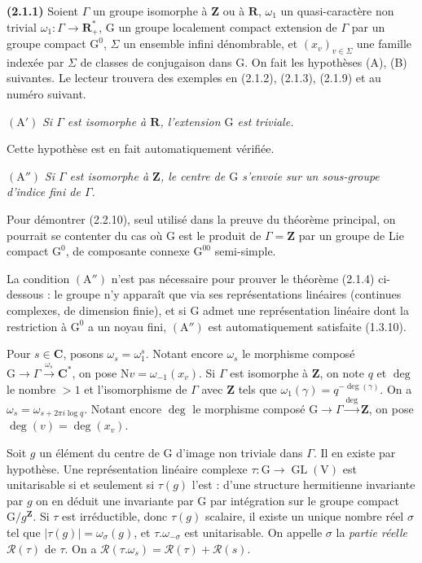 \documentclass[11pt,leqno]{article}
\begin{document}
\textbf{(2.1.1)} Soient \(\Gamma\) un groupe isomorphe à \(\mathbf{Z}\) ou à \(\mathbf{R}\), \(\omega_1\) un quasi-caractère non trivial \(\omega_1:\Gamma\to\mathbf{R}_+^*\), \(\mathrm{G}\) un groupe localement compact extension de \(\Gamma\) par un groupe compact \(\mathrm{G}^0\), \(\Sigma\) un ensemble infini dénombrable, et \((x_v)_{v\in\Sigma}\) une famille indexée par \(\Sigma\) de classes de conjugaison dans \(\mathrm{G}\). On fait les hypothèses (A), (B) suivantes. Le lecteur trouvera des exemples en (2.1.2), (2.1.3), (2.1.9) et au numéro suivant.

\((\mathrm{A}')\) \textit{Si \(\Gamma\) est isomorphe à \(\mathbf{R}\), l’extension \(\mathrm{G}\) est triviale.}

Cette hypothèse est en fait automatiquement vérifiée.

\((\mathrm{A}'')\) \textit{Si \(\Gamma\) est isomorphe à \(\mathbf{Z}\), le centre de \(\mathrm{G}\) s’envoie sur un sous-groupe d’indice fini de \(\Gamma\).}

Pour démontrer (2.2.10), seul utilisé dans la preuve du théorème principal, on pourrait se contenter du cas où \(\mathrm{G}\) est le produit de \(\Gamma=\mathbf{Z}\) par un groupe de Lie compact \(\mathrm{G}^0\), de composante connexe \(\mathrm{G}^{00}\) semi-simple.

La condition \((\mathrm{A}'')\) n’est pas nécessaire pour prouver le théorème (2.1.4) ci-dessous : le groupe n’y apparaît que via ses représentations linéaires (continues complexes, de dimension finie), et si \(\mathrm{G}\) admet une représentation linéaire dont la restriction à \(\mathrm{G}^0\) a un noyau fini, \((\mathrm{A}'')\) est automatiquement satisfaite (1.3.10).

Pour \(s\in\mathbf{C}\), posons \(\omega_s=\omega_1^s\). Notant encore \(\omega_s\) le morphisme composé \(\mathrm{G}\to\Gamma\xrightarrow{\omega_s}\mathbf{C}^*\), on pose \(\mathrm{N}v=\omega_{-1}(x_v)\). Si \(\Gamma\) est isomorphe à \(\mathbf{Z}\), on note \(q\) et \(\deg\) le nombre \(>1\) et l’isomorphisme de \(\Gamma\) avec \(\mathbf{Z}\) tels que \(\omega_1(\gamma)=q^{-\deg(\gamma)}\). On a \(\omega_s=\omega_{s+2\pi i\log q}\). Notant encore \(\deg\) le morphisme composé \(\mathrm{G}\to\Gamma\xrightarrow{\deg}\mathbf{Z}\), on pose \(\deg(v)=\deg(x_v)\).

Soit \(g\) un élément du centre de \(\mathrm{G}\) d’image non triviale dans \(\Gamma\). Il en existe par hypothèse. Une représentation linéaire complexe \(\tau:\mathrm{G}\to\operatorname{GL}(\mathrm{V})\) est unitarisable si et seulement si \(\tau(g)\) l’est : d’une structure hermitienne invariante par \(g\) on en déduit une invariante par \(\mathrm{G}\) par intégration sur le groupe compact \(\mathrm{G}/g^{\mathbf{Z}}\). Si \(\tau\) est irréductible, donc \(\tau(g)\) scalaire, il existe un unique nombre réel \(\sigma\) tel que \(|\tau(g)|=\omega_\sigma(g)\), et \(\tau.\omega_{-\sigma}\) est unitarisable. On appelle \(\sigma\) la \textit{partie réelle} \(\mathscr{R}(\tau)\) de \(\tau\). On a \(\mathscr{R}(\tau.\omega_s)=\mathscr{R}(\tau)+\mathscr{R}(s)\).
\end{document}
